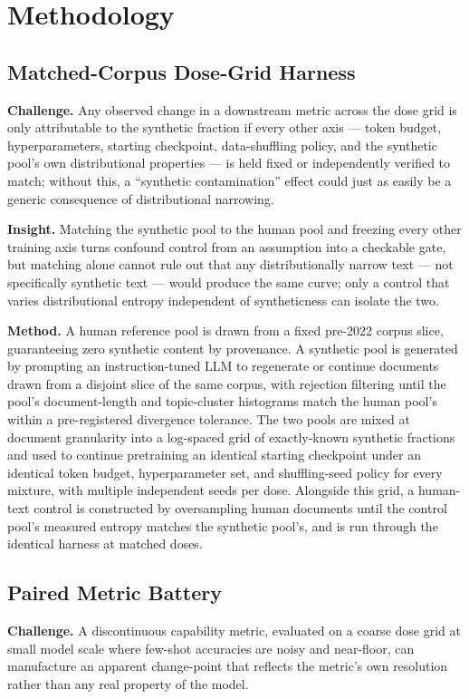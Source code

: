 \documentclass[11pt]{article}
\begin{document}
\section{Methodology}

\subsection{Matched-Corpus Dose-Grid Harness}
\textbf{Challenge.} Any observed change in a downstream metric across the dose grid is only attributable to the synthetic fraction if every other axis --- token budget, hyperparameters, starting checkpoint, data-shuffling policy, and the synthetic pool's own distributional properties --- is held fixed or independently verified to match; without this, a ``synthetic contamination'' effect could just as easily be a generic consequence of distributional narrowing.

\textbf{Insight.} Matching the synthetic pool to the human pool and freezing every other training axis turns confound control from an assumption into a checkable gate, but matching alone cannot rule out that any distributionally narrow text --- not specifically synthetic text --- would produce the same curve; only a control that varies distributional entropy independent of syntheticness can isolate the two.

\textbf{Method.} A human reference pool is drawn from a fixed pre-2022 corpus slice, guaranteeing zero synthetic content by provenance. A synthetic pool is generated by prompting an instruction-tuned LLM to regenerate or continue documents drawn from a disjoint slice of the same corpus, with rejection filtering until the pool's document-length and topic-cluster histograms match the human pool's within a pre-registered divergence tolerance. The two pools are mixed at document granularity into a log-spaced grid of exactly-known synthetic fractions and used to continue pretraining an identical starting checkpoint under an identical token budget, hyperparameter set, and shuffling-seed policy for every mixture, with multiple independent seeds per dose. Alongside this grid, a human-text control is constructed by oversampling human documents until the control pool's measured entropy matches the synthetic pool's, and is run through the identical harness at matched doses.

\subsection{Paired Metric Battery}
\textbf{Challenge.} A discontinuous capability metric, evaluated on a coarse dose grid at small model scale where few-shot accuracies are noisy and near-floor, can manufacture an apparent change-point that reflects the metric's own resolution rather than any real property of the model.
\end{document}
